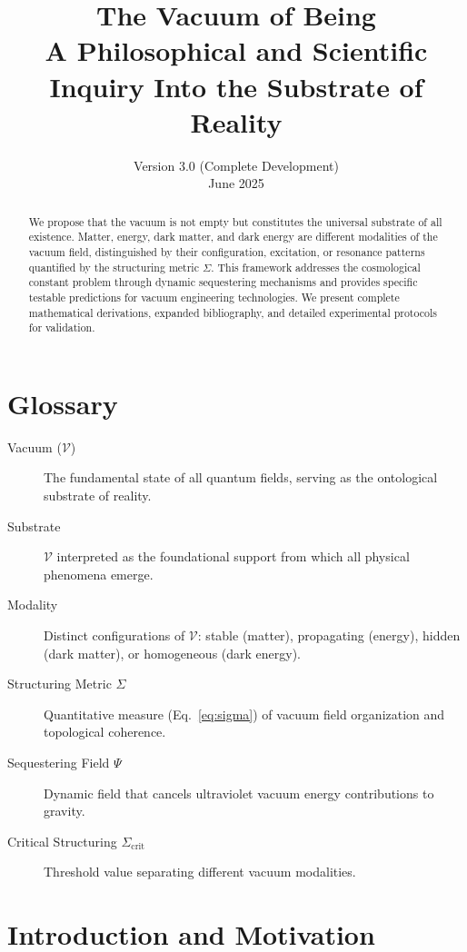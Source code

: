 \documentclass[12pt,a4paper]{article}
\title{The Vacuum of Being\\
\large A Philosophical and Scientific Inquiry Into the Substrate of Reality}
\author{Version 3.0 (Complete Development)\\
\small June 2025}
\date{}
\newcommand{\vacuum}{\mathcal{V}}
\newcommand{\structuring}{\Sigma}
\newcommand{\sequester}{\Psi}
\begin{document}
\maketitle

\begin{abstract}
We propose that the vacuum is not empty but constitutes the universal substrate of all existence. Matter, energy, dark matter, and dark energy are different modalities of the vacuum field, distinguished by their configuration, excitation, or resonance patterns quantified by the structuring metric $\structuring$. This framework addresses the cosmological constant problem through dynamic sequestering mechanisms and provides specific testable predictions for vacuum engineering technologies. We present complete mathematical derivations, expanded bibliography, and detailed experimental protocols for validation.
\end{abstract}

\tableofcontents
\newpage

\section*{Glossary}
\begin{description}
\item[Vacuum ($\vacuum$)] The fundamental state of all quantum fields, serving as the ontological substrate of reality.
\item[Substrate] $\vacuum$ interpreted as the foundational support from which all physical phenomena emerge.
\item[Modality] Distinct configurations of $\vacuum$: stable (matter), propagating (energy), hidden (dark matter), or homogeneous (dark energy).
\item[Structuring Metric $\structuring$] Quantitative measure (Eq.~\ref{eq:sigma}) of vacuum field organization and topological coherence.
\item[Sequestering Field $\sequester$] Dynamic field that cancels ultraviolet vacuum energy contributions to gravity.
\item[Critical Structuring $\structuring_{\text{crit}}$] Threshold value separating different vacuum modalities.
\end{description}

\section{Introduction and Motivation}
\end{document}
